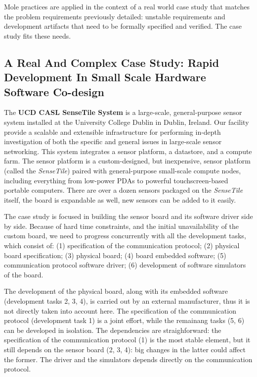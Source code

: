 \documentclass{article}
\newcommand{\ST}{\emph{SenseTile}\xspace}
\begin{document}
Mole practices are applied in the context of a real world case study that matches the problem requirements previously detailed: unstable requirements and development artifacts that need to be formally specified and verified.
The case study fits these needs.



\subsection{A Real And Complex Case Study: Rapid Development In Small Scale Hardware Software Co-design}
\label{subsec:a_real_and_complex_case_study}

The \textbf{UCD CASL SenseTile System} is a large-scale, general-purpose sensor system installed at the University College Dublin in Dublin, Ireland.
Our facility provide a scalable and extensible infrastructure for performing in-depth investigation of both the specific and general issues in large-scale sensor networking.
This system integrates a sensor platform, a datastore, and a compute farm.  
The sensor platform is a custom-designed, but inexpensive, sensor platform (called the \ST) paired with general-purpose small-scale compute nodes, including everything from low-power PDAs to powerful touchscreen-based portable computers.  
There are over a dozen sensors packaged on the \ST itself, the board is expandable as well, new sensors can be added to it easily.

The case study is focused in building the sensor board and its software driver side by side.
Because of hard time constraints, and the initial unavailability of the custom board, we need to progress concurrently with all the development tasks, which consist of: (1) specification of the communication protocol; (2) physical board specification; (3) physical board; (4) board embedded software; (5) communication protocol software driver; (6) development of software simulators of the board.

The development of the physical board, along with its embedded software (development tasks 2, 3, 4), is carried out by an external manufacturer, thus it is not directly taken into account here. 
The specification of the communication protocol (development task 1) is a joint effort, while the remainang tasks (5, 6) can be developed in isolation.
The dependencies are straighforward: the specification of the communication protocol (1) is the most stable element, but it still depends on the sensor board (2, 3, 4): big changes in the latter could affect the former.
The driver and the simulators depends directly on the communication protocol.
\end{document}
